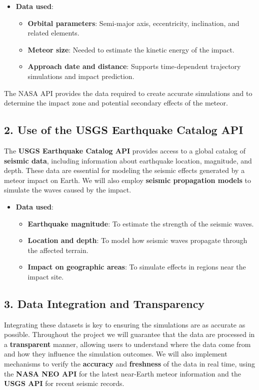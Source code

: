 \documentclass[conference]{IEEEtran}
\begin{document}
\begin{itemize}
	\item \textbf{Data used}:
	      \begin{itemize}
		      \item \textbf{Orbital parameters}: Semi-major axis, eccentricity,
		            inclination, and related elements.
		      \item \textbf{Meteor size}: Needed to estimate the kinetic energy of
		            the impact.
		      \item \textbf{Approach date and distance}: Supports time-dependent
		            trajectory simulations and impact prediction.
	      \end{itemize}
\end{itemize}

The NASA API provides the data required to create accurate simulations and to
determine the impact zone and potential secondary effects of the meteor.

\subsection{2. Use of the USGS Earthquake Catalog API}
The \textbf{USGS Earthquake Catalog API} provides access to a global catalog of
\textbf{seismic data}, including information about earthquake location,
magnitude, and depth. These data are essential for modeling the seismic effects
generated by a meteor impact on Earth. We will also employ \textbf{seismic
	propagation models} to simulate the waves caused by the impact.

\begin{itemize}
	\item \textbf{Data used}:
	      \begin{itemize}
		      \item \textbf{Earthquake magnitude}: To estimate the strength of the
		            seismic waves.
		      \item \textbf{Location and depth}: To model how seismic waves propagate
		            through the affected terrain.
		      \item \textbf{Impact on geographic areas}: To simulate effects in
		            regions near the impact site.
	      \end{itemize}
\end{itemize}

\subsection{3. Data Integration and Transparency}
Integrating these datasets is key to ensuring the simulations are as accurate as
possible. Throughout the project we will guarantee that the data are processed
in a \textbf{transparent} manner, allowing users to understand where the data
come from and how they influence the simulation outcomes. We will also
implement mechanisms to verify the \textbf{accuracy} and \textbf{freshness} of
the data in real time, using the \textbf{NASA NEO API} for the latest near-Earth
meteor information and the \textbf{USGS API} for recent seismic records.
\end{document}
